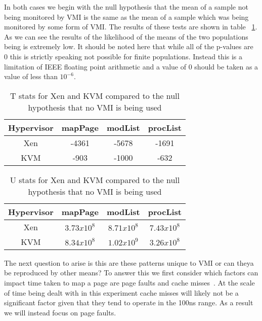 In both cases we begin with the null hypothesis that the mean of a sample not being monitored by VMI is the same as the mean of a sample which was being monitored by some form of VMI. The results of these tests are shown in table ~\ref{TStatsMMap1}. 
As we can see the results of the likelihood of the means of the two populations being is extremely low. It should be noted here that while all of the p-values are 0 this is strictly speaking not possible for finite populations. Instead this is a limitation of IEEE floating point arithmetic and a value of 0 should be taken as a value of less than $10^{-6}$.

	\begin{table}[p!]
		\centering
		\begin{tabular}{| c | c | c | c |}
			\hline
			Hypervisor & mapPage & modList & procList  \\ \hline
			Xen & -4361 & -5678 & -1691  \\  \hline
			KVM & -903 & -1000 & -632  \\ \hline
		\end{tabular}
		\label{TStatsMMap1}
		\caption{T stats for Xen and KVM compared to the null hypothesis that no VMI is being used}
	\end{table}

	\begin{table}[p!]
		\centering
		\begin{tabular}{| c | c | c | c |}
			\hline
			Hypervisor & mapPage & modList & procList  \\ \hline
			Xen & $3.73x10^{8}$ & $8.71x10^{8}$ & $7.43x10^{8}$  \\  \hline
			KVM & $8.34x10^{8}$ & $1.02x10^{9}$ & $3.26x10^{8}$ \\  \hline
		\end{tabular}
		\label{MannWhitneyMMap1}
		\caption{U stats for Xen and KVM compared to the null hypothesis that no VMI is being used}
	\end{table}



The next question to arise is this are these patterns unique to VMI or can theya be reproduced by other means? To answer this we first consider which factors can impact time taken to map a page are page faults and cache misses~\cite{bryant_computer_2003}.  At the scale of time being dealt with in this experiment cache misses will likely not be a significant factor given that they tend to operate in the 100ns range. As a result we will instead focus on page faults. 

